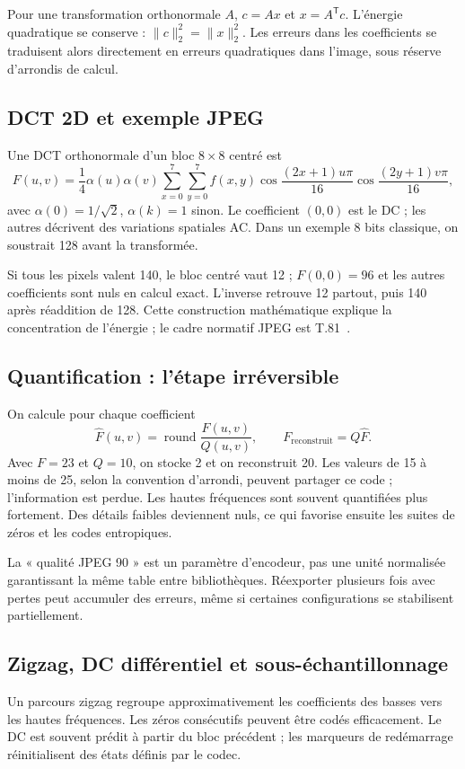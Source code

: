 Pour une transformation orthonormale $A$, $c=Ax$ et
$x=A^{\mathsf T}c$. L'énergie quadratique se conserve :
$\|c\|_2^2=\|x\|_2^2$. Les erreurs dans les coefficients se
traduisent alors directement en erreurs quadratiques dans
l'image, sous réserve d'arrondis de calcul.

\subsection{DCT 2D et exemple JPEG}
Une DCT orthonormale d'un bloc $8\times8$ centré est
\begin{equation}
F(u,v)=\frac14\alpha(u)\alpha(v)
\sum_{x=0}^{7}\sum_{y=0}^{7}f(x,y)
\cos\!\frac{(2x+1)u\pi}{16}
\cos\!\frac{(2y+1)v\pi}{16},
\end{equation}
avec $\alpha(0)=1/\sqrt2$, $\alpha(k)=1$ sinon.
Le coefficient $(0,0)$ est le DC ; les autres décrivent des
variations spatiales AC. Dans un exemple 8 bits classique,
on soustrait 128 avant la transformée.

Si tous les pixels valent 140, le bloc centré vaut 12 ;
$F(0,0)=96$ et les autres coefficients sont nuls en calcul exact.
L'inverse retrouve 12 partout, puis 140 après réaddition de 128.
Cette construction mathématique explique la concentration de
l'énergie ; le cadre normatif JPEG est T.81~\cite{jpeg}.

\subsection{Quantification : l'étape irréversible}
On calcule pour chaque coefficient
\begin{equation}
\widehat F(u,v)=\operatorname{round}\!\frac{F(u,v)}{Q(u,v)},
\qquad F_{\mathrm{reconstruit}}=Q\widehat F.
\end{equation}
Avec $F=23$ et $Q=10$, on stocke 2 et on reconstruit 20.
Les valeurs de 15 à moins de 25, selon la convention d'arrondi,
peuvent partager ce code ; l'information est perdue.
Les hautes fréquences sont souvent quantifiées plus fortement.
Des détails faibles deviennent nuls, ce qui favorise ensuite
les suites de zéros et les codes entropiques.

La « qualité JPEG 90 » est un paramètre d'encodeur, pas une
unité normalisée garantissant la même table entre bibliothèques.
Réexporter plusieurs fois avec pertes peut accumuler des erreurs,
même si certaines configurations se stabilisent partiellement.

\subsection{Zigzag, DC différentiel et sous-échantillonnage}
Un parcours zigzag regroupe approximativement les coefficients
des basses vers les hautes fréquences. Les zéros consécutifs
peuvent être codés efficacement. Le DC est souvent prédit à
partir du bloc précédent ; les marqueurs de redémarrage
réinitialisent des états définis par le codec.

